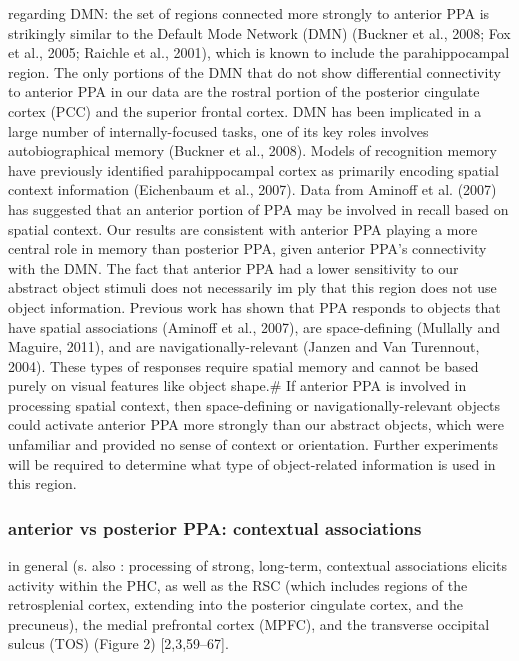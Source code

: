 \documentclass[english]{article}
\begin{document}
\citep{baldassano2013differential} regarding DMN: the set of regions connected
more strongly to anterior PPA is strikingly similar to the Default Mode Network
(DMN) (Buckner et al., 2008; Fox et al., 2005; Raichle et al., 2001), which is
known to include the parahippocampal region.
%
The only portions of the DMN that do not show differential connectivity to
anterior PPA in our data are the rostral portion of the posterior cingulate
cortex (PCC) and the superior frontal cortex.  DMN has been implicated in a
large number of internally-focused tasks, one of its key roles involves
autobiographical memory (Buckner et al., 2008).  Models of recognition memory
have previously identified parahippocampal cortex as primarily encoding spatial
context information (Eichenbaum et al., 2007).
%
Data from Aminoff et al. (2007) has suggested that an anterior portion of PPA
may be involved in recall based on spatial context.
%
Our results are consistent with anterior PPA playing a more central role in
memory than posterior PPA, given anterior PPA's connectivity with the DMN. The
fact that anterior PPA had a lower sensitivity to our abstract object stimuli
does not necessarily im ply that this region does not use object information.
%
Previous work has shown that PPA responds to objects that have spatial
associations (Aminoff et al., 2007), are space-defining (Mullally and Maguire,
2011), and are navigationally-relevant (Janzen and Van Turennout, 2004).
%
These types of responses require spatial memory and cannot be based purely on
visual features like object shape.#
%
If anterior PPA is involved in processing spatial context, then space-defining
or navigationally-relevant objects could activate anterior PPA more strongly
than our abstract objects, which were unfamiliar and provided no sense of
context or orientation.
%
Further experiments will be required to determine what type of object-related
information is used in this region.

\subsubsection{anterior vs posterior PPA: contextual associations}


\citep{aminoff2013role} in general (s. also \citep{aminoff2006parahippocampal}:
processing of strong, long-term, contextual associations elicits activity within
the PHC, as well as the RSC (which includes regions of the retrosplenial cortex,
extending into the posterior cingulate cortex, and the precuneus), the medial
prefrontal cortex (MPFC), and the transverse occipital sulcus (TOS) (Figure 2)
[2,3,59–67].
\end{document}
